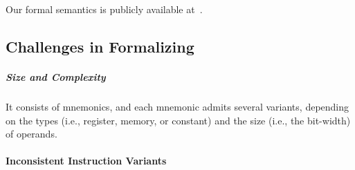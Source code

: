 Our formal semantics is publicly available at~\cite{x86-64-github}.






\subsection{Challenges in Formalizing \ISA}
\label{sec:challenges-in-formalizing-x86}


\subparagraph{Size and Complexity}

It consists of \totalIntel{} mnemonics, and each mnemonic admits several variants, depending on the types (i.e., register, memory, or constant) and the size (i.e., the bit-width) of operands.

\vspace{-2pt}
\paragraph{Inconsistent Instruction Variants}

